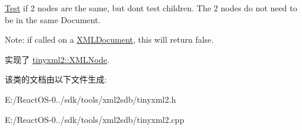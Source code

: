 \hyperlink{class_test}{Test} if 2 nodes are the same, but don\textquotesingle{}t test children. The 2 nodes do not need to be in the same Document.

Note\+: if called on a \hyperlink{classtinyxml2_1_1_x_m_l_document}{X\+M\+L\+Document}, this will return false. 

实现了 \hyperlink{classtinyxml2_1_1_x_m_l_node_a7ce18b751c3ea09eac292dca264f9226}{tinyxml2\+::\+X\+M\+L\+Node}.



该类的文档由以下文件生成\+:\begin{DoxyCompactItemize}
\item 
E\+:/\+React\+O\+S-\/0../sdk/tools/xml2sdb/tinyxml2.\+h\item 
E\+:/\+React\+O\+S-\/0../sdk/tools/xml2sdb/tinyxml2.\+cpp\end{DoxyCompactItemize}
